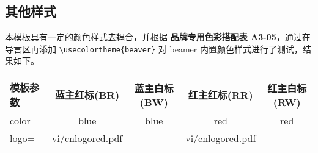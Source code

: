 \documentclass[a4paper,12pt]{article}
\begin{document}
\begin{CJK}{UTF8}{song}
\clearpage
\subsection{其他样式}

本模板具有一定的颜色样式去耦合，并根据 \href{http://vi.sjtu.edu.cn/index.php/articles/base/3}{\textbf{品牌专用色彩搭配表 A3-05}}，通过在导言区再添加 \verb"\usecolortheme{beaver}"
对 \textsf{beamer} 内置颜色样式进行了测试，结果如下。

\begin{center}
    \begin{tabular}{|>{\ttfamily}m{5em}|c|c|c|c|}
        \hline
        模板参数 & 蓝主红标(BR) & 蓝主白标(BW) & 红主红标(RR) & 红主白标(RW) \\
        \hline
        color=   & \scriptsize\ttfamily blue & \scriptsize\ttfamily blue & \scriptsize\ttfamily red           & \scriptsize\ttfamily red   \\
        logo=    & \scriptsize\ttfamily vi/cnlogored.pdf & &\scriptsize\ttfamily  vi/cnlogored.pdf& \\
        \hline
    \end{tabular}


\end{center}
\end{CJK}
\end{document}
